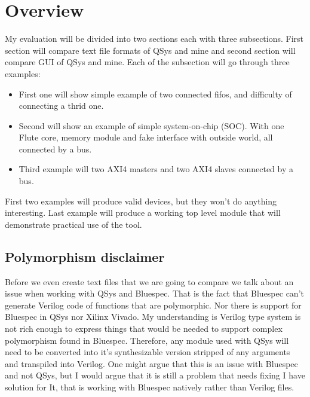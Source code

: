 \documentclass[12pt]{report}
\begin{document}
\section{Overview}
My evaluation will be divided into two sections each with three subsections. First section will compare text file formats of QSys and mine and second section will compare GUI of QSys and mine.
Each of the subsection will go through three examples:
\begin{itemize}
    \item First one will show simple example of two connected fifos, and difficulty of connecting a thrid one.
    \item Second will show an example of simple system-on-chip (SOC). With one Flute core, memory module and fake interface with outside world, all connected by a bus.
    \item Third example will two AXI4 masters and two AXI4 slaves connected by a bus. 
\end{itemize}
First two examples will produce valid devices, but they won't do anything interesting. Last example will produce a working top level module that will demonstrate practical use of the tool.

\subsection{Polymorphism disclaimer}
Before we even create text files that we are going to compare we talk about an issue when working with QSys and Bluespec. That is the fact that Bluespec can't generate Verilog code of functions that are polymorphic. Nor there is support for Bluespec in QSys nor Xilinx Vivado. My understanding is Verilog type system is not rich enough to express things that would be needed to support complex polymorphism found in Bluespec. Therefore, any module used with QSys will need to be converted into it's synthesizable version stripped of any arguments and transpiled into Verilog. One might argue that this is an issue with Bluespec and not QSys, but I would argue that it is still a problem that needs fixing I have solution for It, that is working with Bluespec natively rather than Verilog files. 
\end{document}
